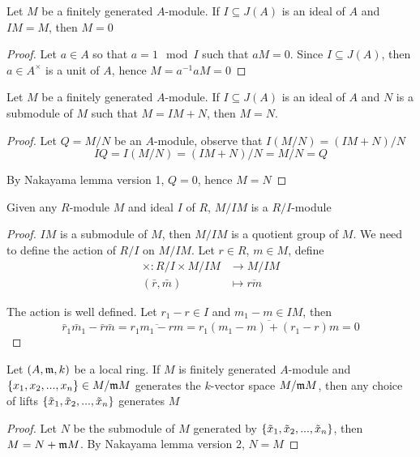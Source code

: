 \begin{lemma}
	Let $M$ be a finitely generated $A$-module. If $I \subseteq J(A)$ is an ideal of $A$ and $IM = M$, then $M = 0$
\end{lemma}

\begin{proof}
	Let $a \in A$ so that $a = 1 \mod I$ such that $aM = 0$. Since $I \subseteq J(A)$, then $a \in A^{\times}$ is a unit of $A$, hence $M = a^{-1} a M = 0$
\end{proof}

\begin{lemma}
	Let $M$ be a finitely generated $A$-module.  If $I \subseteq J(A)$ is an ideal of $A$ and $N$ is a submodule of $M$ such that $M = IM + N$, then $M = N$.
\end{lemma}

\begin{proof}
	Let $Q = M / N$ be an $A$-module, observe that $I(M / N) = (IM + N) / N$
	$$
		IQ = I(M / N) = (IM + N) / N = M / N = Q
	$$
	
	By Nakayama lemma version 1, $Q = 0$, hence $M = N$
\end{proof}

\begin{remark}
	Given any $R$-module $M$ and ideal $I$ of $R$, $M / IM$ is a $R/I$-module
\end{remark}

\begin{proof}
	$IM$ is a submodule of $M$, then $M / IM$ is a quotient group of $M$. We need to define the action of $R/I$ on $M / IM$. Let $r \in R$, $m \in M$, define
	\begin{align*}
		\times: R / I \times M / IM &\to M / IM \\
		(\bar{r}, \bar{m}) &\mapsto \overline{rm}
	\end{align*}
	
	The action is well defined. Let $r_1 - r \in I$ and $m_1 - m \in IM$, then
	$$
	\bar{r}_1 \bar{m}_1 - \bar{r} \bar{m} = \overline{r_1 m_1 - rm}  = \overline{r_1(m_1 - m) + (r_1 - r)m} = 0
	$$	
\end{proof}

\begin{lemma}
	Let $(A, \mathfrak{m}, k)$ be a local ring. If $M$ is finitely generated $A$-module and $\{x_1, x_2, ..., x_n\} \in M / \mathfrak{m} M$ generates the $k$-vector space $M / \mathfrak{m} M$, then any choice of lifts $\{\tilde{x}_1, \tilde{x}_2, ..., \tilde{x}_n\}$ generates $M$
\end{lemma}

\begin{proof}
	Let $N$ be the submodule of $M$ generated by $\{\tilde{x}_1, \tilde{x}_2, ..., \tilde{x}_n\}$, then $M = N + \mathfrak{m}M$. By Nakayama lemma version 2, $N = M$
\end{proof}

